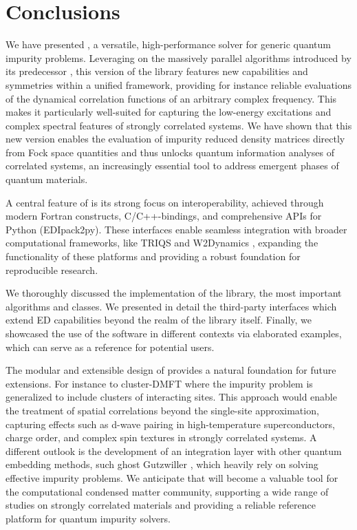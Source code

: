 \documentclass[edipack_sp.tex]{subfiles}
\begin{document}
\section{Conclusions}
We have presented \NAME{}, a versatile, high-performance solver for
generic quantum impurity problems. Leveraging on the massively
parallel algorithms introduced by its predecessor \cite{Amaricci2022CPC}, this version of
the library features new capabilities and symmetries within a unified
framework, providing for instance reliable evaluations of the dynamical correlation
functions of an arbitrary complex frequency.
This makes it particularly well-suited for capturing the
low-energy excitations and complex spectral features of strongly
correlated systems.
We have shown that this new version enables the evaluation of impurity
reduced density matrices directly from Fock space quantities and thus unlocks 
quantum information analyses of correlated systems, an increasingly
essential tool to address emergent phases of quantum materials.

A central feature of \NAME is its strong focus on interoperability,
achieved through modern Fortran constructs, C/C++-bindings, and
comprehensive APIs for Python (EDIpack2py). 
These interfaces enable seamless integration with broader
computational frameworks, like TRIQS \cite{Parcollet2015CPC} and
W2Dynamics \cite{Wallerberger2019CPC}, expanding the
functionality of these platforms and providing a robust foundation for
reproducible research.

We thoroughly discussed the implementation of the \NAME library, the
most important algorithms and classes. We presented in
detail the third-party interfaces which extend ED
capabilities beyond the realm of the library itself.   
Finally, we showcased the use of the \NAME software in different
contexts via elaborated examples, which can serve as a reference for potential users. 

The modular and extensible design of \NAME provides a
natural foundation for future extensions.
For instance to
cluster-DMFT \cite{Capone2004PRB,Kotliar2006RMP,Park2008PRL} where the
impurity problem is generalized to include clusters of interacting
sites. This approach would enable the treatment of spatial
correlations beyond the single-site approximation, capturing effects
such as d-wave pairing in high-temperature superconductors, charge
order, and complex spin textures in strongly correlated systems.
A different outlook is the development of an integration layer with other
quantum embedding methods, such ghost Gutzwiller \cite{Lanata2015PRX},
which heavily rely on solving effective impurity problems.    
We anticipate that \NAME will become a valuable tool for the
computational condensed matter community, supporting a wide range of
studies on strongly correlated materials and providing a reliable
reference platform for quantum impurity solvers.
\end{document}
